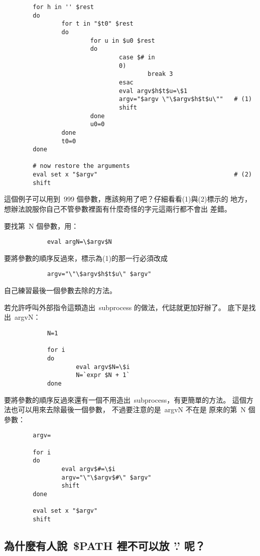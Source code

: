 \documentclass{article}
\begin{document}
\begin{CJK*}{Bg5}{ming}
\begin{verbatim}
        for h in '' $rest
        do
                for t in "$t0" $rest
                do
                        for u in $u0 $rest
                        do
                                case $# in
                                0)
                                        break 3
                                esac
                                eval argv$h$t$u=\$1
                                argv="$argv \"\$argv$h$t$u\""   # (1)
                                shift
                        done
                        u0=0
                done
                t0=0
        done

        # now restore the arguments
        eval set x "$argv"                                      # (2)
        shift
\end{verbatim}
\normalsize
	這個例子可以用到~999 個參數，應該夠用了吧？仔細看看(1)與(2)標示的
	地方，想辦法說服你自己不管參數裡面有什麼奇怪的字元這兩行都不會出
	差錯。  

	要找第~N 個參數，用：
\begin{verbatim}
	        eval argN=\$argv$N
\end{verbatim}

	要將參數的順序反過來，標示為(1)的那一行必須改成
\begin{verbatim}
	        argv="\"\$argv$h$t$u\" $argv"
\end{verbatim}
	自己練習最後一個參數去除的方法。

	若允許呼叫外部指令這類造出~subprocess 的做法，代誌就更加好辦了。
	底下是找出~argvN：
\begin{verbatim}
	        N=1

	        for i
	        do
	                eval argv$N=\$i
	                N=`expr $N + 1`
	        done
\end{verbatim}
	要將參數的順序反過來還有一個不用造出~subprocess，有更簡單的方法。
	這個方法也可以用來去除最後一個參數， 不過要注意的是~argvN 不在是
	原來的第~N 個參數：
\begin{verbatim}
        argv=

        for i
        do
                eval argv$#=\$i
                argv="\"\$argv$#\" $argv"
                shift
        done

        eval set x "$argv"
        shift
\end{verbatim}

\subsection{為什麼有人說~\$PATH 裡不可以放 '.' 呢？}


\end{CJK*}
\end{document}
